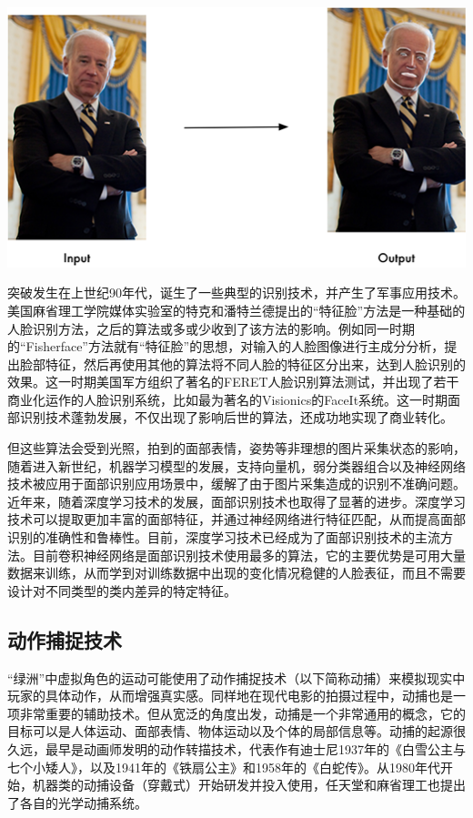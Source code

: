 \begin{marginfigure}
    \includegraphics{images/tech_8.png}
\end{marginfigure}

突破发生在上世纪90年代，诞生了一些典型的识别技术，并产生了军事应用技术。美国麻省理工学院媒体实验室的特克和潘特兰德提出的“特征脸”方法是一种基础的人脸识别方法，之后的算法或多或少收到了该方法的影响。例如同一时期的“Fisherface”方法就有“特征脸”的思想，对输入的人脸图像进行主成分分析，提出脸部特征，然后再使用其他的算法将不同人脸的特征区分出来，达到人脸识别的效果。这一时期美国军方组织了著名的FERET人脸识别算法测试，并出现了若干商业化运作的人脸识别系统，比如最为著名的Visionics的FaceIt系统。这一时期面部识别技术蓬勃发展，不仅出现了影响后世的算法，还成功地实现了商业转化。

但这些算法会受到光照，拍到的面部表情，姿势等非理想的图片采集状态的影响，随着进入新世纪，机器学习模型的发展，支持向量机，弱分类器组合以及神经网络技术被应用于面部识别应用场景中，缓解了由于图片采集造成的识别不准确问题。近年来，随着深度学习技术的发展，面部识别技术也取得了显著的进步。深度学习技术可以提取更加丰富的面部特征，并通过神经网络进行特征匹配，从而提高面部识别的准确性和鲁棒性。目前，深度学习技术已经成为了面部识别技术的主流方法。目前卷积神经网络是面部识别技术使用最多的算法，它的主要优势是可用大量数据来训练，从而学到对训练数据中出现的变化情况稳健的人脸表征，而且不需要设计对不同类型的类内差异的特定特征。

\subsection{动作捕捉技术}

“绿洲”中虚拟角色的运动可能使用了动作捕捉技术（以下简称动捕）来模拟现实中玩家的具体动作，从而增强真实感。同样地在现代电影的拍摄过程中，动捕也是一项非常重要的辅助技术。但从宽泛的角度出发，动捕是一个非常通用的概念，它的目标可以是人体运动、面部表情、物体运动以及个体的局部信息等。动捕的起源很久远，最早是动画师发明的动作转描技术，代表作有迪士尼1937年的《白雪公主与七个小矮人》，以及1941年的《铁扇公主》和1958年的《白蛇传》。从1980年代开始，机器类的动捕设备（穿戴式）开始研发并投入使用，任天堂和麻省理工也提出了各自的光学动捕系统。

